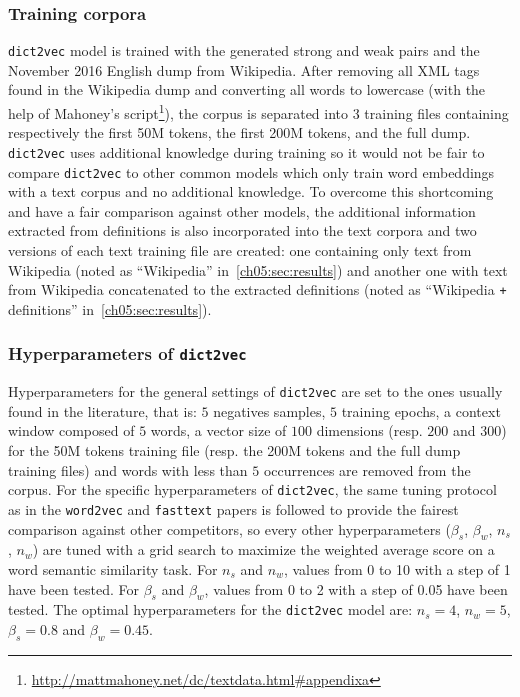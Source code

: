     \subsubsection{Training corpora}
      \label{ch05:subsubsec:training-corpora}
      \texttt{dict2vec} model is trained with the generated strong and weak
      pairs and the November 2016 English dump from Wikipedia. After removing
      all XML tags found in the Wikipedia dump and converting all words to
      lowercase (with the help of Mahoney's
      script\footnote{\url{http://mattmahoney.net/dc/textdata.html\#appendixa}}),
      the corpus is separated into 3 training files containing respectively the
      first 50M tokens, the first 200M tokens, and the full dump.
      \texttt{dict2vec} uses additional knowledge during training so it would
      not be fair to compare \texttt{dict2vec} to other common models which only
      train word embeddings with a text corpus and no additional knowledge. To
      overcome this shortcoming and have a fair comparison against other models,
      the additional information extracted from definitions is also incorporated
      into the text corpora and two versions of each text training file are
      created: one containing only text from Wikipedia (noted as ``Wikipedia''
      in~\autoref{ch05:sec:results}) and another one with text from Wikipedia
      concatenated to the extracted definitions (noted as ``Wikipedia \texttt{+}
      definitions'' in~\autoref{ch05:sec:results}).

    \subsubsection{Hyperparameters of \texttt{dict2vec}}
      \label{ch05:subsubsec:hyperparameters}
      Hyperparameters for the general settings of \texttt{dict2vec} are set to
      the ones usually found in the literature, that is: $5$ negatives samples,
      $5$ training epochs, a context window composed of $5$ words, a vector size
      of $100$ dimensions (resp. $200$ and $300$) for the 50M tokens
      training file (resp. the 200M tokens and the full dump training files) and
      words with less than $5$ occurrences are removed from the corpus. For the
      specific hyperparameters of \texttt{dict2vec}, the same tuning protocol as
      in the \texttt{word2vec} and \texttt{fasttext} papers is followed to
      provide the fairest comparison against other competitors, so every other
      hyperparameters ($\beta_{s}$, $\beta_{w}$, $n_s$, $n_w$) are tuned with a
      grid search to maximize the weighted average score on a word semantic
      similarity task. For $n_s$ and $n_w$, values from 0 to 10 with a step of 1
      have been tested. For $\beta_{s}$ and $\beta_{w}$, values from 0 to 2 with
      a step of 0.05 have been tested. The optimal hyperparameters for the
      \texttt{dict2vec} model are: $n_s = 4$, $n_w = 5$, $\beta_{s} = 0.8$ and
      $\beta_{w} = 0.45$.


